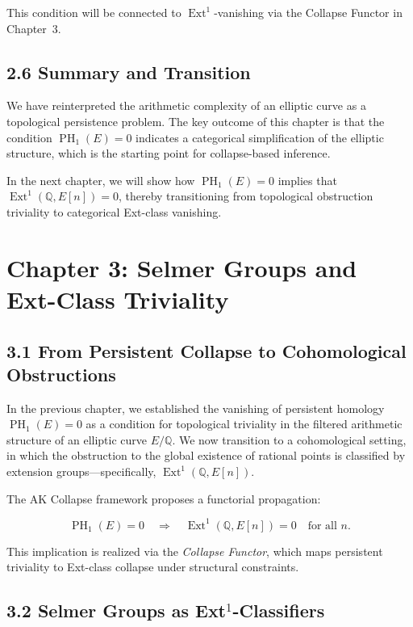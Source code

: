\documentclass[11pt]{article}
\DeclareMathOperator{\Ext}{Ext}
\DeclareMathOperator{\PH}{PH}
\newcommand{\QQ}{\mathbb{Q}}
\begin{document}
This condition will be connected to $\Ext^1$-vanishing via the Collapse Functor in Chapter~3.

\subsection{2.6 Summary and Transition}

We have reinterpreted the arithmetic complexity of an elliptic curve as a topological persistence problem.  
The key outcome of this chapter is that the condition $\PH_1(E)=0$ indicates a categorical simplification of the elliptic structure, which is the starting point for collapse-based inference.

In the next chapter, we will show how $\PH_1(E)=0$ implies that $\Ext^1(\QQ,E[n]) = 0$,  
thereby transitioning from topological obstruction triviality to categorical Ext-class vanishing.




\section{Chapter 3: Selmer Groups and Ext-Class Triviality}

\subsection{3.1 From Persistent Collapse to Cohomological Obstructions}

In the previous chapter, we established the vanishing of persistent homology $\PH_1(E) = 0$ as a condition for topological triviality in the filtered arithmetic structure of an elliptic curve $E/\QQ$.  
We now transition to a cohomological setting, in which the obstruction to the global existence of rational points is classified by extension groups—specifically, $\Ext^1(\QQ,E[n])$.

The AK Collapse framework proposes a functorial propagation:

\[
\PH_1(E) = 0 \quad \Longrightarrow \quad \Ext^1(\QQ,E[n]) = 0 \quad \text{for all } n.
\]

This implication is realized via the \emph{Collapse Functor}, which maps persistent triviality to Ext-class collapse under structural constraints.

\subsection{3.2 Selmer Groups as Ext$^1$-Classifiers}
\end{document}
